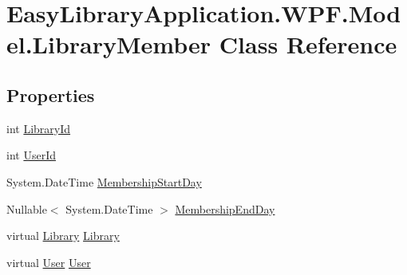 \hypertarget{class_easy_library_application_1_1_w_p_f_1_1_model_1_1_library_member}{}\section{Easy\+Library\+Application.\+W\+P\+F.\+Model.\+Library\+Member Class Reference}
\label{class_easy_library_application_1_1_w_p_f_1_1_model_1_1_library_member}
\subsection*{Properties}
\begin{DoxyCompactItemize}
\item 
int \mbox{\hyperlink{class_easy_library_application_1_1_w_p_f_1_1_model_1_1_library_member_a40b4dfbadba49a983d0c859e10ada31f}{Library\+Id}}
\item 
int \mbox{\hyperlink{class_easy_library_application_1_1_w_p_f_1_1_model_1_1_library_member_a572a7e31c296b13ebbbf42b2f509fa74}{User\+Id}}
\item 
System.\+Date\+Time \mbox{\hyperlink{class_easy_library_application_1_1_w_p_f_1_1_model_1_1_library_member_a7fe4901d3cc0efd5f22fe446b8a2334d}{Membership\+Start\+Day}}
\item 
Nullable$<$ System.\+Date\+Time $>$ \mbox{\hyperlink{class_easy_library_application_1_1_w_p_f_1_1_model_1_1_library_member_a104524bc6a0ef7a43541178a55208bb5}{Membership\+End\+Day}}
\item 
virtual \mbox{\hyperlink{class_easy_library_application_1_1_w_p_f_1_1_model_1_1_library}{Library}} \mbox{\hyperlink{class_easy_library_application_1_1_w_p_f_1_1_model_1_1_library_member_a010ce1fcc06ece9188d211ff15b00d4d}{Library}}
\item 
virtual \mbox{\hyperlink{class_easy_library_application_1_1_w_p_f_1_1_model_1_1_user}{User}} \mbox{\hyperlink{class_easy_library_application_1_1_w_p_f_1_1_model_1_1_library_member_a01117972b11e997376e668be35fe183d}{User}}
\end{DoxyCompactItemize}



